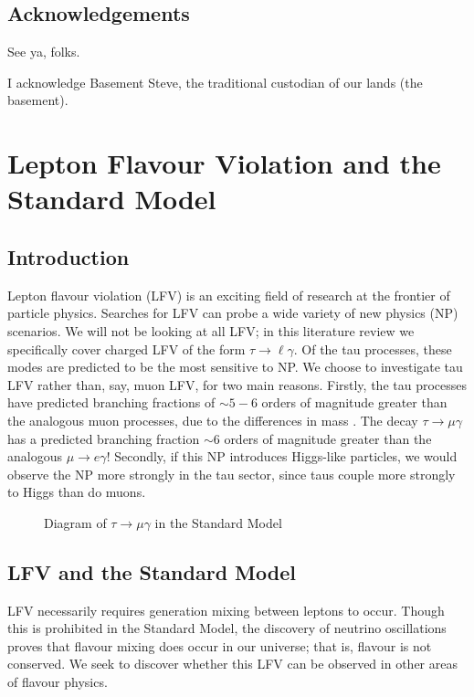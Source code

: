 \documentclass[12pt]{thesis}  %
\newcommand{\tmg}{\tau\to\mu\gamma}
\newcommand{\tlg}{\tau\to\ell\gamma}
\begin{document}
\pagestyle{fancy}
\rhead{\textsc{Thesis: $\tlg$}}
\setcounter{page}{1}

\section*{Acknowledgements}

See ya, folks.

I acknowledge Basement Steve, the traditional custodian of our lands (the basement).

\pagebreak

\chapter{Lepton Flavour Violation and the Standard Model}

\section{Introduction}

Lepton flavour violation (LFV) is an exciting field of research at the frontier of particle physics. Searches for LFV can probe a wide variety of new physics (NP) scenarios. We will not be looking at all LFV; in this literature review we specifically cover charged LFV of the form $\tlg$. Of the tau processes, these modes are predicted to be the most sensitive to NP. We choose to investigate tau LFV rather than, say, muon LFV, for two main reasons. Firstly, the tau processes have predicted branching fractions of $\sim 5 - 6$ orders of magnitude greater than the analogous muon processes, due to the differences in mass \cite{Paradisi:2016}. The decay $\tmg$ has a predicted branching fraction $\sim 6$ orders of magnitude greater than the analogous $\mu\to e \gamma$! Secondly, if this NP introduces Higgs-like particles, we would observe the NP more strongly in the tau sector, since taus couple more strongly to Higgs than do muons.


\begin{figure}[h]
\centering
\caption{Diagram of $\tmg$ in the Standard Model}
\label{}
\end{figure}

\section{LFV and the Standard Model}

LFV necessarily requires generation mixing between leptons to occur. Though this is prohibited in the Standard Model, the discovery of neutrino oscillations proves that flavour mixing does occur in our universe; that is, flavour is not conserved. We seek to discover whether this LFV can be observed in other areas of flavour physics.
\end{document}

